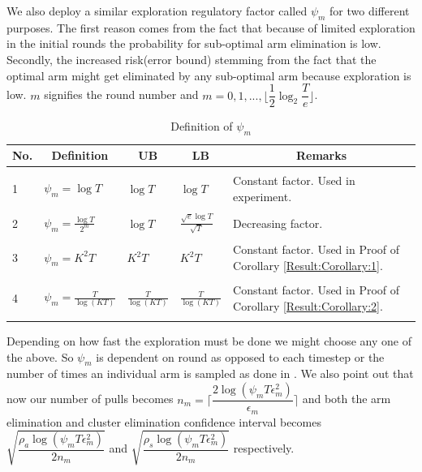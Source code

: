  We also deploy a similar exploration regulatory factor called $\psi_{m}$ for two different purposes. The first reason comes from the fact that because of limited exploration in the initial rounds the probability for sub-optimal arm elimination is low. Secondly, the increased risk(error bound) stemming from the fact that the optimal arm might get eliminated by any sub-optimal arm because exploration is low. $m$ signifies the round number and $m=0,1,...,\big \lfloor \dfrac{1}{2}\log_{2} \dfrac{T}{e}\big\rfloor$.
	
\begin{table}
\caption{Definition of $\psi_{m}$}
\label{App:D:table:1}
\begin{center}
\begin{tabular}{p{1.5cm}p{3.5cm}p{1.5cm}p{1.5cm}p{4.5cm}}
\multicolumn{1}{c}{\bf No.} &\multicolumn{1}{c}{\bf Definition}  &\multicolumn{1}{c}{\bf UB} &\multicolumn{1}{c}{\bf LB} &\multicolumn{1}{c}{\bf Remarks} \\
\hline \\
1	&$\psi_{m}=\log{T}$         & $\log{T}$  &$\log{T}$ & Constant factor. Used in experiment. \\ 
\hline \\
2	&$\psi_{m}=\frac{\log T}{2^{m}}$         & $\log T$  &$\frac{\sqrt{e}\log T}{\sqrt{T}}$ & Decreasing factor.  \\  
\hline \\
3	&$\psi_{m}=K^{2}T$         & $K^{2}T$  &$ K^{2}T$ & Constant factor. Used in Proof of Corollary \ref{Result:Corollary:1}. \\ 
\hline \\ 
4	&$\psi_{m}=\frac{T}{\log (KT)}$         & $\frac{T}{\log (KT)}$  &$\frac{T}{\log (KT)}$ & Constant factor. Used in Proof of Corollary \ref{Result:Corollary:2}. \\ 
\hline \\
\end{tabular}
\end{center}	
\end{table}
	
 Depending on how fast the exploration must be done we might choose any one of the above. So $\psi_{m}$ is dependent on round as opposed to each timestep or the number of times an individual arm is sampled as done in \cite{liu2016modification}. We also point out that now our number of pulls becomes $n_{m}=\bigg\lceil\dfrac{2\log{(\psi_{m}T\epsilon_{m}^{2})}}{\epsilon_{m}}\bigg\rceil$ and both the arm elimination and cluster elimination confidence interval becomes $\sqrt{\dfrac{\rho_{a}\log{(\psi_{m}T\epsilon_{m}^{2})}}{2 n_{m}}}$ and $\sqrt{\dfrac{\rho_{s} \log{(\psi_{m}T\epsilon_{m}^{2})}}{2 n_{m}}}$  respectively.
	
